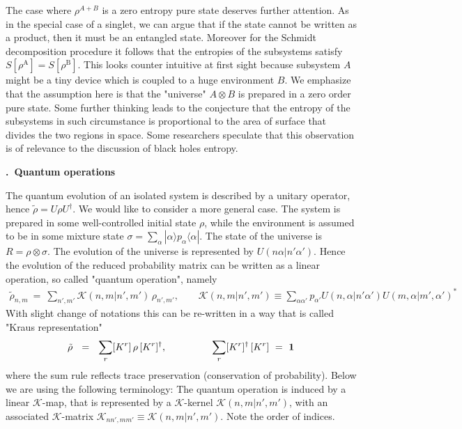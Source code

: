 \documentclass[onecolumn,fleqn, 11pt]{revtex4}
\newcommand{\tbox}[1]{\text{#1}}
\newcommand{\beq}{\begin{eqnarray}}
\newcommand{\eeq}{\end{eqnarray}}
\renewcommand{\thesubsection}{\arabic{subsection}}
\renewcommand{\thesubsubsection}{\arabic{subsubsection}}
\newcommand{\sheadC}[1]
{
\addtocounter{subsubsection}{1}
\vspace{5mm}
{\bf \thesubsection.\thesubsubsection \ #1}  
\nopagebreak
\phantomsection
}
\begin{document}
The case where $\rho^{A+B}$ is 
a zero entropy pure state 
deserves further attention.
As in the special case of a singlet, 
we can argue that if the state 
cannot be written as a product, then 
it must be an entangled state. 
Moreover for the Schmidt decomposition 
procedure it follows 
that the entropies of the subsystems  
satisfy $S[\rho^{\tbox{A}}]=S[\rho^{\tbox{B}}]$. 
This looks counter intuitive at first 
sight because subsystem $A$ might be 
a tiny device which is coupled  
to a huge environment $B$. We emphasize  
that the assumption here is that the 
"universe" $A \otimes B$ is prepared 
in a zero order pure state. 
Some further thinking leads to the conjecture 
that the entropy of the subsystems in 
such circumstance is proportional to the 
area of surface that divides the two regions 
in space. Some researchers speculate that 
this observation is of relevance to the discussion 
of black holes entropy.   



\sheadC{Quantum operations}

The quantum evolution of an isolated system is described 
by a unitary operator, hence ${\tilde{\rho} = U \rho U^{\dag}}$.
We would like to consider a more general case.
The system is prepared in some well-controlled initial state  $\rho$, 
while the environment is assumed to be in some mixture 
state ${\sigma = \sum_{\alpha} |\alpha\rangle p_{\alpha} \langle\alpha|}$.
The state of the universe is ${R = \rho \otimes \sigma}$. 
The evolution of the universe is represented by $U(n\alpha|n'\alpha')$.     
Hence the evolution of the reduced probability matrix 
can be written as a linear operation, so called "quantum operation", namely 
\beq 
\tilde{\rho}_{n,m} \ = \ 
\sum_{n',m'} \mathcal{K}(n,m|n',m') \, \rho_{n',m'}, 
\ \ \ \ \ \ \ \ \ 
\mathcal{K}(n,m|n',m') \equiv \sum_{\alpha\alpha'}p_{\alpha'}U(n,\alpha|n'\alpha') U(m,\alpha|m',\alpha')^*
\eeq
With slight change of notations this can be re-written 
in a way that is called "Kraus representation" 
\beq
\tilde{\rho} \ \ = \ \  \sum_r [K^r] \, \rho \, [K^r]^{\dagger},
\ \ \ \ \ \ \ \ \ \ \ \ \ \ 
\sum_r [K^r]^{\dagger} \, [K^r] \ = \ \bf{1}
\eeq
where the sum rule reflects trace preservation (conservation of probability). 
Below we are using the following terminology: 
The quantum operation is induced by a linear $\mathcal{K}$-map, 
that is represented by a $\mathcal{K}$-kernel ${\mathcal{K}(n,m|n',m')}$,
with an associated $\mathcal{K}$-matrix ${\mathcal{K}_{nn',mm'} \equiv \mathcal{K}(n,m|n',m')}$. 
Note the order of indices. 
\end{document}
